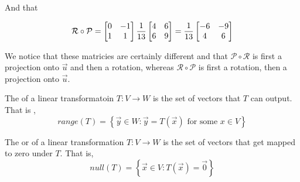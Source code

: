\documentclass[11pt]{book}
\begin{document}
And that 

\begin{equation*}
    \mathcal{R} \circ \mathcal{P} = \begin{bmatrix} 0 & -1 \\ 1 & 1 \end{bmatrix} \frac{1}{13}
    \begin{bmatrix} 4 & 6 \\ 6 & 9 \end{bmatrix} = \frac{1}{13} \begin{bmatrix} -6 & -9 \\ 4 & 6 \end{bmatrix}
\end{equation*}

We notice that these matricies are certainly different and that $\mathcal{P}
\circ \mathcal{R}$ is first a projection onto $\vec{u}$ and then a rotation,
whereas $\mathcal{R} \circ \mathcal{P}$ is first a rotation, then a projection
onto $\vec{u}$.



\begin{defn}[Range]\label{defn:range}
    The  of a linear transformatoin $T : V \to W $ is the set of
    vectors that $T$ can output. That is ,
    \begin{equation*}
        \mathit{range} {\left( T \right)} = \left\{ \vec{y} \in W : \vec{y} =
        T\left(\vec{x} \right) \text{ for some } x \in V  \right\}
    \end{equation*}
\end{defn}

\begin{defn}\label{defn:null_space}
    The  or  of a linear transformation $T :
    V\to W $ is the set of vectors that get mapped to zero under $T$. That is,
    \begin{equation*}
        \mathit{null} {\left( T \right)} = \left\{ \vec{x} \in V:
        T\left(\vec{x}\right) = \vec{0} \right\}
    \end{equation*}
\end{defn}
\end{document}
